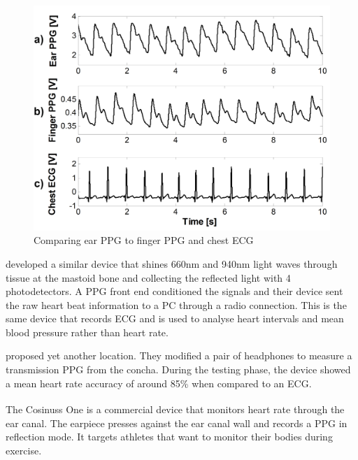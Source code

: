 \medskip

\begin{figure}[h]
   \centering
   \includegraphics[scale=0.15]{figs/DaHe}
   \caption{Comparing ear PPG to finger PPG and chest ECG \citep{da2010ear}}
   \label{fig:DaHe}
\end{figure}

\cite{winokur2012wearable} developed a similar device that shines 660nm and 940nm light waves through tissue at the mastoid bone and collecting the reflected light with 4 photodetectors. A PPG front end conditioned the signals and their device sent the raw heart beat information to a PC through a radio connection. This is the same device that records ECG and is used to analyse heart intervals and mean blood pressure rather than heart rate.

\medskip
\cite{buskeheartbeat} proposed yet another location. They modified a pair of headphones to measure a transmission PPG from the concha. During the testing phase, the device showed a mean heart rate accuracy of around 85\% when compared to an ECG.

\medskip
The Cosinuss One\textsuperscript \textregistered{} is a commercial device that monitors heart rate through the ear canal. The earpiece presses against the ear canal wall and records a PPG in reflection mode. It targets athletes that want to monitor their bodies during exercise.

